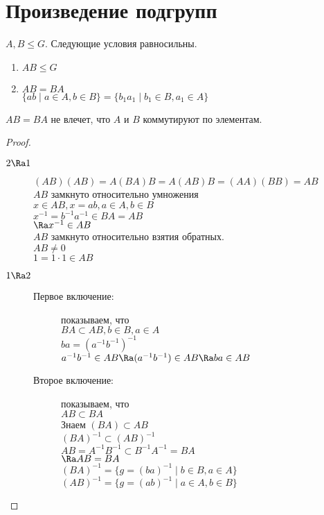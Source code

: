 ﻿\section{Произведение подгрупп}
\begin{theorem}
$A, B \le G$. Следующие условия равносильны.\\
    \begin{enumerate}
    \item $AB \le G$\\
    \item $AB = BA$\\
    $\{ab \mid a \in  A, b \in B\} = \{b_1a_1 \mid b_1 \in B, a_1 \in A\}$\\
    \end{enumerate}
\end{theorem}
\begin{Rem}
$AB = BA$ не влечет, что $A$ и $B$ коммутируют по элементам.
\end{Rem}
\begin{proof}
\begin{description}
\item[$2 \Ra 1$]
$(AB)(AB) = A(BA)B = A(AB)B = (AA)(BB) = AB$\\
$AB$ замкнуто относительно умножения\\
$x \in AB, x = ab, a\in A, b \in B$\\
$x^{-1} = b^{-1}a^{-1} \in BA = AB$\\
$\Ra x^{-1} \in AB$\\
$AB$ замкнуто относительно взятия обратных.\\
$AB \ne 0$\\
$1 = 1\cdot1 \in AB$\\

\item[$1 \Ra 2$]
\begin{description}
\item[Первое включение:] показываем, что\\
$BA \subset AB, b \in B, a \in A$\\
$ba = (a^{-1}b^{-1})^{-1}$\\
$a^{-1}b^{-1} \in AB \Ra (a^{-1}b^{-1}) \in AB \Ra ba \in AB$\\

\item[Второе включение:] показываем, что\\
$AB \subset BA$\\
Знаем $(BA) \subset AB$\\
$(BA)^{-1} \subset (AB)^{-1}$\\
$AB = A^{-1}B^{-1} \subset B^{-1}A^{-1} = BA$\\
$\Ra AB = BA$\\

$(BA)^{-1} = \{g = (ba)^{-1}\mid b \in B, a \in A\}$\\
$(AB)^{-1} = \{g = (ab)^{-1}\mid a \in A, b \in B\}$\\
\end{description}
\end{description}
\end{proof}
